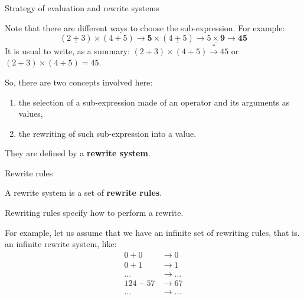 %
\begin{frame}{Strategy of evaluation and rewrite systems}

  Note that there are different ways to choose the sub-expression. For
  example:
  \begin{equation*}
    (\underline{2+3}) \times (4+5) \rightarrow \textbf{5} \times
    (\underline{4+5}) \rightarrow \underline{5 \times \textbf{9}}
    \rightarrow \textbf{45}
  \end{equation*}
  It is usual to write, as a summary: \((2+3)\times(4+5)
  \xrightarrow{*} 45\) or \((2+3)\times(4+5)=45\).

  \bigskip

  So, there are two concepts involved here:
  \begin{enumerate}

    \item the selection of a sub-expression made of an operator and
      its arguments as values,

    \item the rewriting of such sub-expression into a value.

  \end{enumerate}
  They are defined by a \textbf{rewrite system}.

\end{frame}

%
\begin{frame}{Rewrite rules}

  A rewrite system is a set of \textbf{rewrite rules}.

  \bigskip

  Rewriting rules specify how to perform a rewrite.

  \bigskip

  For example, let us assume that we have an infinite set of rewriting
  rules, that is. an infinite rewrite system, like:
  \begin{align*}
    0 + 0 & \rightarrow 0\\
    0 + 1 & \rightarrow 1\\
    \dots & \rightarrow \dots\\
    124 - 57 & \rightarrow 67\\
    \dots & \rightarrow \dots
  \end{align*}

\end{frame}

